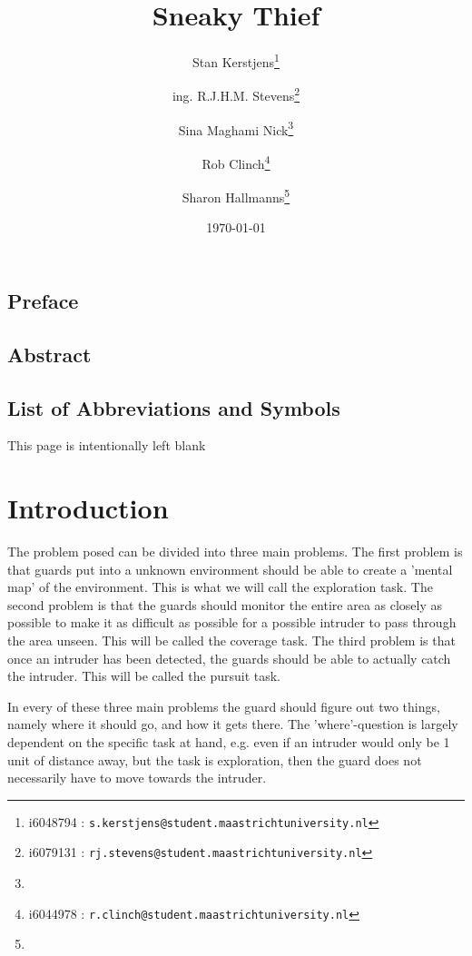 \documentclass{report}
\title{Sneaky Thief}
\author{Stan Kerstjens\thanks{i6048794 : \texttt{s.kerstjens@student.maastrichtuniversity.nl}}}
\author{ing. R.J.H.M. Stevens\thanks{i6079131 : \texttt{rj.stevens@student.maastrichtuniversity.nl}}} %
\author{Sina Maghami Nick\thanks{}} %
\author{Rob Clinch\thanks{i6044978 :
\texttt{r.clinch@student.maastrichtuniversity.nl}}}
\author{Sharon Hallmanns\thanks{}} %
\affil{Department of Knowledge Engineering, Maastricht University}
\date{\today}
\begin{document}
\maketitle

\section*{Preface}
\section*{Abstract}
\listoffigures
\section*{List of Abbreviations and Symbols}
\tableofcontents\newpage



\newpage
\begin{center} 
	This page is intentionally left blank 
\end{center}

\newpage

\chapter{Introduction}




	The problem posed can be divided into three main problems. The first problem is that guards put into a unknown environment should be able to create a 'mental map' of the environment. This is what we will call the exploration task. The second problem is that the guards should monitor the entire area as closely as possible to make it as difficult as possible for a possible intruder to pass through the area unseen. This will be called the coverage task. The third problem is that once an intruder has been detected, the guards should be able to actually catch the intruder. This will be called the pursuit task.

	In every of these three main problems the guard should figure out two things, namely where it should go, and how it gets there. The 'where'-question is largely dependent on the specific task at hand, e.g. even if an intruder would only be 1 unit of distance away, but the task is exploration, then the guard does not necessarily have to move towards the intruder.
\end{document}
